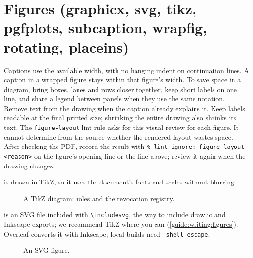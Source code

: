 \section{Figures (graphicx, svg, tikz, pgfplots, subcaption, wrapfig, rotating, placeins)}\label{guide:latex:figures}
Captions use the available width, with no hanging indent on continuation lines. A caption in a wrapped figure stays within that figure's width.
To save space in a diagram, bring boxes, lanes and rows closer together, keep short labels on one line, and share a legend between panels when they use the same notation. Remove text from the drawing when the caption already explains it. Keep labels readable at the final printed size; shrinking the entire drawing also shrinks its text.
The \texttt{figure-layout} lint rule asks for this visual review for each figure. It cannot determine from the source whether the rendered layout wastes space. After checking the PDF, record the result with \texttt{\% lint-ignore: figure-layout <reason>} on the figure's opening line or the line above; review it again when the drawing changes.

 is drawn in TikZ, so it uses the document's fonts and scales without blurring.
\begin{figure}[!ht]
  \centering
  \caption{A TikZ diagram: roles and the revocation registry.}\label{guide:fig:latex:tikz}
\end{figure}

 is an SVG file included with \texttt{\textbackslash includesvg}, the way to include draw.io and Inkscape exports; we recommend TikZ where you can (\cref{guide:writing:figures}). Overleaf converts it with Inkscape; local builds need \texttt{-shell-escape}.
\begin{figure}[!ht]
  \centering
  
  \caption{An SVG figure.}\label{guide:fig:latex:svg}
\end{figure}

